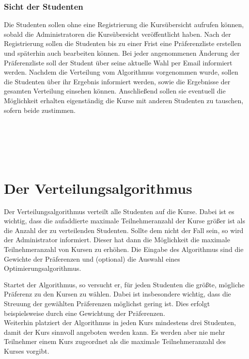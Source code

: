                 
            \subsubsection{Sicht der Studenten}
                Die Studenten sollen ohne eine Registrierung die Kursübersicht aufrufen können, sobald die Administratoren die Kursübersicht veröffentlicht haben.
                Nach der Registrierung sollen die Studenten bis zu einer Frist eine Präferenzliste erstellen und späterhin auch bearbeiten können.
                Bei jeder angenommenen Änderung der Präferenzliste soll der Student über seine aktuelle Wahl per Email informiert werden.
                Nachdem die Verteilung vom Algorithmus vorgenommen wurde, sollen die Studenten über ihr Ergebnis informiert werden, sowie die Ergebnisse der gesamten Verteilung einsehen können.
                Anschließend sollen sie eventuell die Möglichkeit erhalten eigenständig die Kurse mit anderen Studenten zu tauschen, sofern beide zustimmen.
    
    
    	\\
    	\\
    	\\
    	\\
    
    
            
    
    \section{Der Verteilungsalgorithmus}
        Der Verteilungsalgorithmus verteilt alle Studenten auf die Kurse.
        Dabei ist es wichtig, dass die aufaddierte maximale Teilnehmeranzahl der Kurse größer ist als die Anzahl der zu verteilenden Studenten.
        Sollte dem nicht der Fall sein, so wird der Administrator informiert.
        Dieser hat dann die Möglichkeit die maximale Teilnehmeranzahl von Kursen zu erhöhen.
        Die Eingabe des Algorithmus sind die Gewichte der Präferenzen und (optional) die Auswahl eines Optimierungsalgorithmus.
        
        Startet der Algorithmus, so versucht er, für jeden Studenten die größte, mögliche Präferenz zu den Kursen zu wählen.
        Dabei ist insbesondere wichtig, dass die Streuung der gewählten Präferenzen möglichst gering ist.
        Dies erfolgt beispielsweise durch eine Gewichtung der Präferenzen.\\
        Weiterhin platziert der Algorithmus in jeden Kurs mindestens drei Studenten, damit der Kurs sinnvoll angeboten werden kann.
        Es werden aber nie mehr Teilnehmer einem Kurs zugeordnet als die maximale Teilnehmeranzahl des Kurses vorgibt.
        

